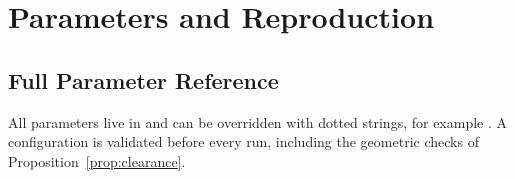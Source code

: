 \chapter{Parameters and Reproduction}
\label{app:params}

\parindent0pt

\section{Full Parameter Reference}

All parameters live in  and can be overridden with dotted strings, for example
. A configuration is validated before every run, including the
geometric checks of Proposition~\ref{prop:clearance}.

